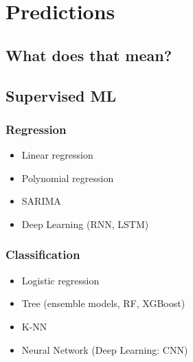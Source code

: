 



\begin{frame}
   \titlepage
\end{frame}



\begin{frame}
   \tableofcontents
\end{frame}

\section{Predictions}


\subsection{What does that mean?}



\subsection{Supervised ML}

\subsubsection{Regression}
\begin{itemize}
   \item Linear regression
   \item Polynomial regression
   \item SARIMA
   \item Deep Learning (RNN, LSTM)
\end{itemize}


\subsubsection{Classification}
\begin{itemize}
   \item Logistic regression
   \item Tree (ensemble models, RF, XGBoost)
   \item K-NN
   \item Neural Network (Deep Learning: CNN)
\end{itemize}


